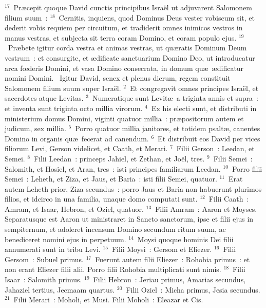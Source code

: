 ${}^{17}$~Pr\ae cepit quoque David cunctis principibus Isra\"el ut adjuvarent Salomonem filium suum~:
${}^{18}$~Cernitis, inquiens, quod Dominus Deus vester vobiscum sit, et dederit vobis requiem per circuitum, et tradiderit omnes inimicos vestros in manus vestras, et subjecta sit terra coram Domino, et coram populo ejus.
${}^{19}$~Pr\ae bete igitur corda vestra et animas vestras, ut qu\ae ratis Dominum Deum vestrum~: et consurgite, et \ae dificate sanctuarium Domino Deo, ut introducatur arca fœderis Domini, et vasa Domino consecrata, in domum qu\ae\ \ae dificatur nomini Domini.
~\lettrine[lines=10,image=true,loversize=0.05,lraise=-0.03]{I}{}gitur David, senex et plenus dierum, regem constituit Salomonem filium suum super Isra\"el.
${}^{2}$~Et congregavit omnes principes Isra\"el, et sacerdotes atque Levitas.
${}^{3}$~Numeratique sunt Levit\ae\ a triginta annis et supra~: et inventa sunt triginta octo millia virorum.
${}^{4}$~Ex his electi sunt, et distributi in ministerium domus Domini, viginti quatuor millia~: pr\ae positorum autem et judicum, sex millia.
${}^{5}$~Porro quatuor millia janitores, et totidem psalt\ae , canentes Domino in organis qu\ae\ fecerat ad canendum.
${}^{6}$~Et distribuit eos David per vices filiorum Levi, Gerson videlicet, et Caath, et Merari.
${}^{7}$~Filii Gerson~: Leedan, et Semei.
${}^{8}$~Filii Leedan~: princeps Jahiel, et Zethan, et Jo\"el, tres.
${}^{9}$~Filii Semei~: Salomith, et Hosiel, et Aran, tres~: isti principes familiarum Leedan.
${}^{10}$~Porro filii Semei~: Leheth, et Ziza, et Jaus, et Baria~: isti filii Semei, quatuor.
${}^{11}$~Erat autem Leheth prior, Ziza secundus~: porro Jaus et Baria non habuerunt plurimos filios, et idcirco in una familia, unaque domo computati sunt.
${}^{12}$~Filii Caath~: Amram, et Isaar, Hebron, et Oziel, quatuor.
${}^{13}$~Filii Amram~: Aaron et Moyses. Separatusque est Aaron ut ministraret in Sancto sanctorum, ipse et filii ejus in sempiternum, et adoleret incensum Domino secundum ritum suum, ac benediceret nomini ejus in perpetuum.
${}^{14}$~Moysi quoque hominis Dei filii annumerati sunt in tribu Levi.
${}^{15}$~Filii Moysi~: Gersom et Eliezer.
${}^{16}$~Filii Gersom~: Subuel primus.
${}^{17}$~Fuerunt autem filii Eliezer~: Rohobia primus~: et non erant Eliezer filii alii. Porro filii Rohobia multiplicati sunt nimis.
${}^{18}$~Filii Isaar~: Salomith primus.
${}^{19}$~Filii Hebron~: Jeriau primus, Amarias secundus, Jahaziel tertius, Jecmaam quartus.
${}^{20}$~Filii Oziel~: Micha primus, Jesia secundus.
${}^{21}$~Filii Merari~: Moholi, et Musi. Filii Moholi~: Eleazar et Cis.
